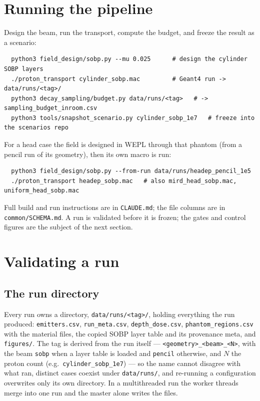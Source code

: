 \documentclass[11pt]{article}
\newcommand{\file}[1]{\texttt{#1}}
\begin{document}
\section{Running the pipeline}
\label{sec:using}

Design the beam, run the transport, compute the budget, and freeze the result as a
scenario:
\begin{verbatim}
  python3 field_design/sobp.py --mu 0.025      # design the cylinder SOBP layers
  ./proton_transport cylinder_sobp.mac         # Geant4 run -> data/runs/<tag>/
  python3 decay_sampling/budget.py data/runs/<tag>   # -> sampling_budget_inroom.csv
  python3 tools/snapshot_scenario.py cylinder_sobp_1e7   # freeze into the scenarios repo
\end{verbatim}
For a head case the field is designed in WEPL through that phantom (from a
pencil run of its geometry), then its own macro is run:
\begin{verbatim}
  python3 field_design/sobp.py --from-run data/runs/headep_pencil_1e5
  ./proton_transport headep_sobp.mac   # also mird_head_sobp.mac, uniform_head_sobp.mac
\end{verbatim}
Full build and run instructions are in \file{CLAUDE.md}; the file columns are in
\file{common/SCHEMA.md}. A run is validated before it is frozen; the gates and
control figures are the subject of the next section.

\section{Validating a run}
\label{sec:validation}

\subsection{The run directory}
Every run owns a directory, \file{data/runs/<tag>/}, holding everything the run
produced: \file{emitters.csv}, \file{run\_meta.csv}, \file{depth\_dose.csv},
\file{phantom\_regions.csv} with the material files, the copied SOBP layer
table and its provenance meta, and \file{figures/}. The tag is derived from the
run itself --- \file{<geometry>\_<beam>\_<N>}, with the beam \file{sobp} when a
layer table is loaded and \file{pencil} otherwise, and $N$ the proton count
(e.g.\ \file{cylinder\_sobp\_1e7}) --- so the name cannot disagree with what
ran, distinct cases coexist under \file{data/runs/}, and re-running a
configuration overwrites only its own directory. In a multithreaded run the
worker threads merge into one run and the master alone writes the files.
\end{document}
